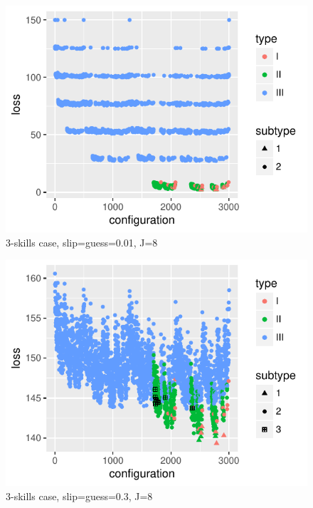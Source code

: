 \documentclass{edm_template}
\begin{document}
\begin{figure}[h!]
  \begin{center}
  \includegraphics[width=\columnwidth]{simResults/LossBestConfig_theta001_J8.pdf}
  \end{center}
  \caption{3-skills case, slip=guess=0.01, J=8}  
  \label{fig:theta001J8ThreeSkill}
\end{figure}

\begin{figure}[h!]
  \begin{center}
  \includegraphics[width=\columnwidth]{simResults/LossBestConfig_theta03_J8.pdf}
  \end{center}
  \caption{3-skills case, slip=guess=0.3, J=8}  
  \label{fig:theta03J8ThreeSkill}
\end{figure}
\end{document}
